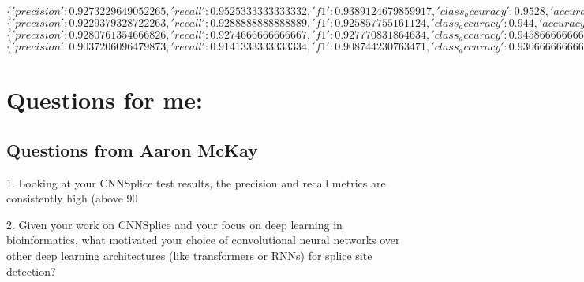 $\{'precision': 0.9273229649052265, 'recall': 0.9525333333333332, 'f1': 0.9389124679859917, 'class_accuracy': 0.9528, 'accuracy': 0.9527999758720398\}$\\

$\{'precision': 0.9229379328722263, 'recall': 0.9288888888888889, 'f1': 0.925857755161124, 'class_accuracy': 0.944, 'accuracy': 0.9440000057220459\}$\\

$\{'precision': 0.9280761354666826, 'recall': 0.9274666666666667, 'f1': 0.927770831864634, 'class_accuracy': 0.9458666666666666, 'accuracy': 0.9458666443824768\}$\\

$\{'precision': 0.9037206096479873, 'recall': 0.9141333333333334, 'f1': 0.908744230763471, 'class_accuracy': 0.9306666666666666, 'accuracy': 0.9306666851043701\}$



\section{Questions for me:}

\subsection{Questions from Aaron McKay}
1. Looking at your CNNSplice test results, the precision and recall metrics are consistently high (above 90%

2. Given your work on CNNSplice and your focus on deep learning in bioinformatics, what motivated your choice of convolutional neural networks over other deep learning architectures (like transformers or RNNs) for splice site detection?